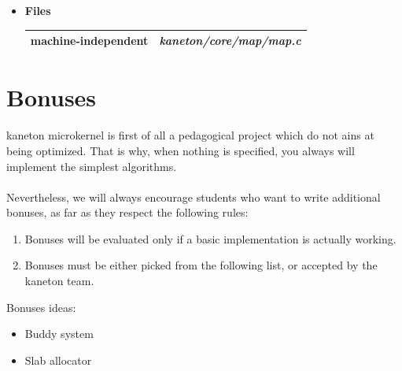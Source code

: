 \begin{itemize}
	 {
	   This function releases a previously reserved map, this
	   includes releasing both virtual and physical memory.
	 }

  \item {\bf {Files}}\\

    \begin{tabular}{| l | l |}
      \hline
      machine-independent & {\em kaneton/core/map/map.c}\\\hline
    \end{tabular}
\end{itemize}

%
%

\newpage

\section{Bonuses}

kaneton microkernel is first of all a pedagogical project which do not ains at being
optimized. That is why, when nothing is specified, you always will implement the simplest
algorithms.\\
\\
Nevertheless, we will always encourage students who want to write additional bonuses, as far as they respect the following rules:
\begin{enumerate}
  \item Bonuses will be evaluated only if a basic implementation is actually working.
  \item Bonuses must be either picked from the following list, or accepted by the kaneton team.\\
\end{enumerate}

Bonuses ideas:
\begin{itemize}
\item Buddy system
\item Slab allocator
\end{itemize}
